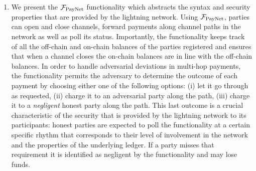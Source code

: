 \begin{enumerate}
\item We present the $\mathcal{F}_{\mathrm{PayNet}}{}$ functionality which abstracts the syntax and
security properties that are provided by the lightning network.  Using $\mathcal{F}_{\mathrm{PayNet}}{}$, parties can open and close channels,
forward payments along channel paths in the network as well as poll its status.
Importantly, the functionality keeps track of all the off-chain and on-chain
balances of the parties registered and ensures that when a channel closes the
on-chain balances are in line with the off-chain balances. In order to handle
adversarial deviations in multi-hop payments, the functionality permits the
adversary to determine the outcome of each payment by choosing either one of the
following options: (i) let it go through as requested, (ii) charge it to an
adversarial party along the path, (iii) charge it to a {\em negligent} honest
party along the path. This last outcome is a crucial characteristic of the
security that is provided by the lightning network to its participants: honest
parties are expected to poll the functionality at a certain specific rhythm that
corresponds to their level of involvement in the network and the properties of
the underlying ledger. If a party misses that requirement it is identified as
negligent by the functionality and may lose funds.


\end{enumerate}

